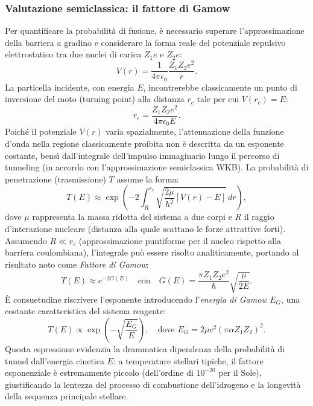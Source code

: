 \documentclass[a4paper,11pt]{report}
\begin{document}
\begin{approfondimento}[colback= white, colframe=green!35!black, no shadow, title={Applicazione astrofisica: il modello di Gamow-Bethe}]
\subsubsection{Valutazione semiclassica: il fattore di Gamow}
Per quantificare la probabilità di fusione, è necessario superare l'approssimazione della barriera a gradino e considerare la forma reale del potenziale repulsivo elettrostatico tra due nuclei di carica $Z_1e$ e $Z_2e$:
\begin{equation}
    V(r) = \frac{1}{4\pi\epsilon_0} \frac{Z_1 Z_2 e^2}{r}.
\end{equation}
La particella incidente, con energia $E$, incontrerebbe classicamente un punto di inversione del moto (turning point) alla distanza $r_c$ tale per cui $V(r_c) = E$:
\begin{equation}
    r_c = \frac{Z_1 Z_2 e^2}{4\pi\epsilon_0 E}.
\end{equation}
Poiché il potenziale $V(r)$ varia spazialmente, l'attenuazione della funzione d'onda nella regione classicamente proibita non è descritta da un esponente costante, bensì dall'integrale dell'impulso immaginario lungo il percorso di tunneling (in accordo con l'approssimazione semiclassica WKB). La probabilità di penetrazione (trasmissione) $T$ assume la forma:
\begin{equation}
    T(E) \approx \exp\left( -2 \int_{R}^{r_c} \sqrt{\frac{2\mu}{\hbar^2} [V(r) - E]} \, dr \right),
\end{equation}
dove $\mu$ rappresenta la massa ridotta del sistema a due corpi e $R$ il raggio d'interazione nucleare (distanza alla quale scattano le forze attrattive forti). Assumendo $R \ll r_c$ (approssimazione puntiforme per il nucleo rispetto alla barriera coulombiana), l'integrale può essere risolto analiticamente, portando al risultato noto come \textit{Fattore di Gamow}:
\begin{equation}
    T(E) \approx e^{-2G(E)} \quad \text{con} \quad G(E) = \frac{\pi Z_1 Z_2 e^2}{\hbar} \sqrt{\frac{\mu}{2E}}.
\end{equation}
È consuetudine riscrivere l'esponente introducendo l'\textit{energia di Gamow} $E_G$, una costante caratteristica del sistema reagente:
\begin{equation}
    T(E) \propto \exp\left( -\sqrt{\frac{E_G}{E}} \right), \quad \text{dove } E_G = 2\mu c^2 (\pi \alpha Z_1 Z_2)^2.
\end{equation}
Questa espressione evidenzia la drammatica dipendenza della probabilità di tunnel dall'energia cinetica $E$: a temperature stellari tipiche, il fattore esponenziale è estremamente piccolo (dell'ordine di $10^{-20}$ per il Sole), giustificando la lentezza del processo di combustione dell'idrogeno e la longevità della sequenza principale stellare.
\end{approfondimento}
\end{document}
